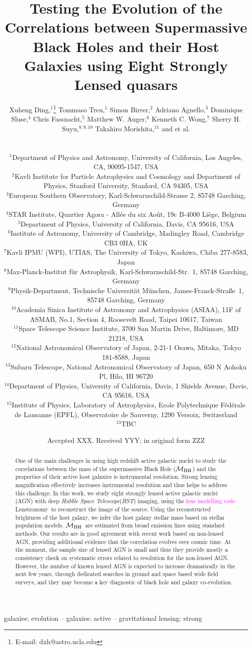 \documentclass[fleqn,usenatbib]{mnras}
\title[Mass relations by lensed AGN hosts]{Testing the Evolution of the Correlations between Supermassive Black Holes and their Host Galaxies using Eight Strongly Lensed quasars}
\author[X. Ding et al.]{
Xuheng Ding,$^{1}$\thanks{E-mail: dxh@astro.ucla.edu}
Tommaso Treu,$^{1}$
Simon Birrer,$^{2}$
Adriano Agnello,$^{3}$\newauthor
Dominique Sluse,$^{4}$
Chris Fassnacht,$^{5}$
Matthew W. Auger,$^{6}$
Kenneth C. Wong,$^{7}$ \newauthor
Sherry H. Suyu,$^{8,9,10}$
Takahiro Morishita,$^{11}$
\pink{
Cristian E. Rusu,$^{12,13,14}$
Aymeric Galan,$^{15}$}\newauthor
and et al.
\\
\\
\\
$^{1}$Department of Physics and Astronomy, University of California, Los Angeles, CA, 90095-1547, USA\\
$^{2}$Kavli Institute for Particle Astrophysics and Cosmology and Department of Physics, Stanford University, Stanford, CA 94305, USA\\
$^{3}$European Southern Observatory, Karl-Schwarzschild-Strasse 2, 85748 Garching, Germany\\
$^{4}$STAR Institute, Quartier Agora - All\'ee du six Ao\^ut, 19c B-4000 Li\`ege, Belgium\\
$^{5}$Department of Physics, University of California, Davis, CA 95616, USA\\
$^{6}$Institute of Astronomy, University of Cambridge, Madingley Road, Cambridge CB3 0HA, UK\\
$^{7}$Kavli IPMU (WPI), UTIAS, The University of Tokyo, Kashiwa, Chiba 277-8583, Japan\\
$^{8}$Max-Planck-Institut f{\"u}r Astrophysik, Karl-Schwarzschild-Str.~1, 85748 Garching, Germany\\
$^{9}$Physik-Department, Technische Universit\"at M\"unchen, James-Franck-Stra\ss{}e~1, 85748 Garching, Germany\\
$^{10}$Academia Sinica Institute of Astronomy and Astrophysics (ASIAA), 11F of ASMAB, No.1, Section 4, Roosevelt Road, Taipei 10617, Taiwan\\
$^{11}$Space Telescope Science Institute, 3700 San Martin Drive, Baltimore, MD 21218, USA\\
$^{12}$National Astronomical Observatory of Japan, 2-21-1 Osawa, Mitaka, Tokyo 181-8588, Japan\\
$^{13}$Subaru Telescope, National Astronomical Observatory of Japan, 650 N Aohoku Pl, Hilo, HI 96720\\
$^{14}$Department of Physics, University of California, Davis, 1 Shields Avenue, Davis, CA 95616, USA\\
$^{15}$Institute of Physics, Laboratory of Astrophysics, Ecole Polytechnique 
F\'ed\'erale de Lausanne (EPFL), Observatoire de Sauverny, 1290 Versoix, 
Switzerland\\
$^{13}$TBC
}
\date{Accepted XXX. Received YYY; in original form ZZZ}
\newcommand{\hst}{{\it HST}}
\newcommand{\mbh}{$\mathcal M_{\rm BH}$}
\newcommand{\lenstronomy}{{\sc Lenstronomy}}
\newcommand{\pink}[1]{{\textcolor{magenta}{#1}}}
\begin{document}
\label{firstpage}
\pagerange{\pageref{firstpage}--\pageref{lastpage}}
\maketitle

\begin{abstract}
  One of the main challenges in using high redshift active galactic nuclei to study the correlations between the mass of the supermassive Black Hole (\mbh) and the properties of their active host galaxies is instrumental resolution. Strong lensing magnification effectively increases instrumental resolution and thus helps to address this challenge. In this work, we study eight strongly lensed active galactic nuclei (AGN) with deep {\it Hubble Space Telescope}(\hst) imaging, using the \pink{lens modelling code} \lenstronomy\ to reconstruct the image of the source. Using the reconstructed brightness of the host galaxy, we infer the host galaxy stellar mass based on stellar population models. 
  \mbh\ are estimated from broad emission lines using standard methods. Our results are in good agreement with recent work based on non-lensed AGN, providing additional evidence that the correlation evolves over cosmic time.  At the moment, the sample size of lensed AGN is small and thus they provide mostly a consistency check on systematic errors related to resolution for the non-lensed AGN. However, the number of known lensed AGN is expected to increase dramatically in the next few years, through dedicated searches in ground and space based wide field surveys, and they may become a key diagnostic of black hole and galaxy co-evolution. 
\end{abstract}

\begin{keywords}
galaxies: evolution -- galaxies: active -- gravitational lensing: strong
\end{keywords}


\end{document}
